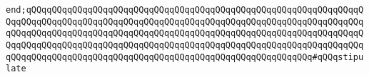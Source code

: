 \verb|end;qQQqqQQqqQQqqQQqqQQqqQQqqQQqqQQqqQQqqQQqqQQqqQQqqQQqqQQqqQQqqQQqqQQqqQQqqQQqqQQqqQQqqQQqqQQqqQQqqQQqqQQqqQQqqQQqqQQqqQQqqQQqqQQqqQQqqQQqqQQqqQQqqQQqqQQqqQQqqQQqqQQqqQQqqQQqqQQqqQQqqQQqqQQqqQQqqQQqqQQqqQQqqQQqqQQqqQQqqQQqqQQqqQQqqQQqqQQqqQQqqQQqqQQqqQQqqQQqqQQqqQQqqQQqqQQqqQQqqQQqqQQqqQQqqQQqqQQqqQQqqQQqqQQqqQQqqQQqqQQqqQQqqQQqqQQqqQQq#qQQqstipulate|\newline
\newline

